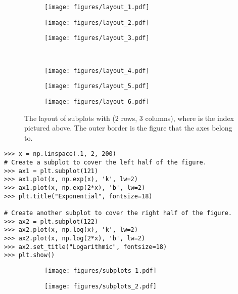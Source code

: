 \begin{figure}[H] %
\captionsetup[subfigure]{justification=centering}
\centering
\begin{framed}
\begin{subfigure}{.32\textwidth}
    \centering
    \texttt{[image: figures/layout\_1.pdf]}
\end{subfigure}
%
\begin{subfigure}{.32\textwidth}
    \centering
    \texttt{[image: figures/layout\_2.pdf]}
\end{subfigure}
%
\begin{subfigure}{.32\textwidth}
    \centering
    \texttt{[image: figures/layout\_3.pdf]}
\end{subfigure}
\\
\begin{subfigure}{.32\textwidth}
    \centering
    \texttt{[image: figures/layout\_4.pdf]}
\end{subfigure}
%
\begin{subfigure}{.32\textwidth}
    \centering
    \texttt{[image: figures/layout\_5.pdf]}
\end{subfigure}
%
\begin{subfigure}{.32\textwidth}
    \centering
    \texttt{[image: figures/layout\_6.pdf]}
\end{subfigure}
\end{framed}
\caption{The layout of subplots with  (2 rows, 3 columns), where  is the index pictured above. The outer border is the figure that the axes belong to.}
\label{fig:subplots-layout}
\end{figure}

\begin{lstlisting}
>>> x = np.linspace(.1, 2, 200)
# Create a subplot to cover the left half of the figure.
>>> ax1 = plt.subplot(121)
>>> ax1.plot(x, np.exp(x), 'k', lw=2)
>>> ax1.plot(x, np.exp(2*x), 'b', lw=2)
>>> plt.title("Exponential", fontsize=18)

# Create another subplot to cover the right half of the figure.
>>> ax2 = plt.subplot(122)
>>> ax2.plot(x, np.log(x), 'k', lw=2)
>>> ax2.plot(x, np.log(2*x), 'b', lw=2)
>>> ax2.set_title("Logarithmic", fontsize=18)
>>> plt.show()
\end{lstlisting}

\begin{figure}[H] %
\captionsetup[subfigure]{justification=centering}
\centering
\begin{framed}
\begin{subfigure}{.49\textwidth}
    \centering
    \texttt{[image: figures/subplots\_1.pdf]}
\end{subfigure}
%
\begin{subfigure}{.49\textwidth}
    \centering
    \texttt{[image: figures/subplots\_2.pdf]}
\end{subfigure}
\end{framed}
\end{figure}

